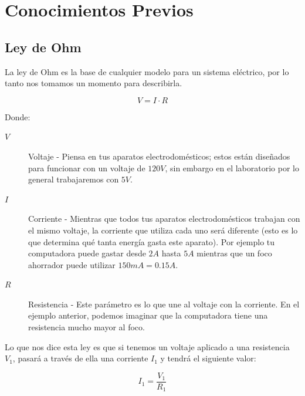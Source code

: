 
\section{Conocimientos Previos}


	\subsection{Ley de Ohm}

		La ley de Ohm es la base de cualquier modelo para un sistema eléctrico, por lo tanto nos tomamos un momento para describirla.

		\begin{equation}
			V = I \cdot R
		\end{equation}

		Donde:

		\begin{description}
			\item[$V$] Voltaje - Piensa en tus aparatos electrodomésticos; estos están diseñados para funcionar con un voltaje de $120 V$, sin embargo en el laboratorio por lo general trabajaremos con $5 V$.
			\item[$I$] Corriente - Mientras que todos tus aparatos electrodomésticos trabajan con el mismo voltaje, la corriente que utiliza cada uno será diferente (esto es lo que determina qué tanta energía gasta este aparato). Por ejemplo tu computadora puede gastar desde $2 A$ hasta $5 A$ mientras que un foco ahorrador puede utilizar $150 mA = 0.15 A$.
			\item[$R$] Resistencia - Este parámetro es lo que une al voltaje con la corriente. En el ejemplo anterior, podemos imaginar que la computadora tiene una resistencia mucho mayor al foco.
		\end{description}

		Lo que nos dice esta ley es que si tenemos un voltaje aplicado a una resistencia $V_1$, pasará a través de ella una corriente $I_1$ y tendrá el siguiente valor:

		\begin{equation}
			I_1 = \frac{V_1}{R_1}
		\end{equation}

